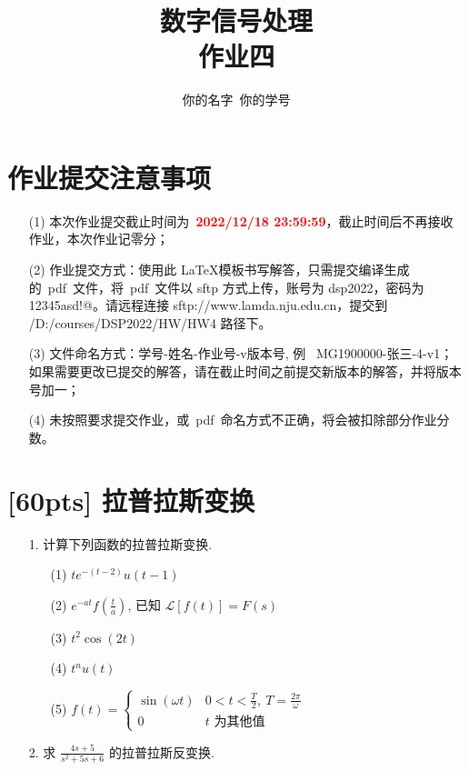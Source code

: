 \documentclass[a4paper,UTF8]{article}
\numberwithin{equation}{section}
\begin{document}
	
	\title{数字信号处理\\
		作业四}
	\author{你的名字\, 你的学号} 
	\maketitle
	
	\section*{作业提交注意事项}
	\begin{tcolorbox}
		\begin{enumerate}
			\item[(1)] 本次作业提交截止时间为~\textcolor{red}{\textbf{2022/12/18  23:59:59}}，截止时间后不再接收作业，本次作业记零分；
			\item[(2)] 作业提交方式：使用此 \LaTeX 模板书写解答，只需提交编译生成的~pdf~文件，将~pdf~文件以 sftp 方式上传，账号为 dsp2022，密码为 12345asd!@。请远程连接 sftp://www.lamda.nju.edu.cn，提交到 /D:/courses/DSP2022/HW/HW4 路径下。
			\item[(3)] 文件命名方式：学号-姓名-作业号-v版本号, 例~ MG1900000-张三-4-v1；如果需要更改已提交的解答，请在截止时间之前提交新版本的解答，并将版本号加一；
			\item[(4)] 未按照要求提交作业，或~pdf~命名方式不正确，将会被扣除部分作业分数。
		\end{enumerate}
	\end{tcolorbox}
	
	
	\newpage
	\section{[60pts] 拉普拉斯变换}
	\begin{itemize}
		\item[1.]计算下列函数的拉普拉斯变换.
		\begin{itemize}
			\item[(1)]$ te^{-(t-2)}u(t-1) $
			\item[(2)]$ e^{-at}f\!\left(\frac{t}{a}\right) $, 已知 $\mathcal{L}[f(t)]=F(s)$
			\item[(3)]$ t^2\cos(2t) $
			\item[(4)]$ t^nu(t) $
			\item[(5)]$ f(t)=\left\{\begin{array}{ll}
				\sin (\omega t) & 0<t<\frac{T}{2},\ T=\frac{2 \pi}{\omega} \\
				0 & t \text { 为其他值 }
			\end{array} \right. $
		\end{itemize}
		
		\item[2.]求 $ \displaystyle \frac{4s+5}{s^2+5s+6} $ 的拉普拉斯反变换.
	\end{itemize}
	
\end{document}
